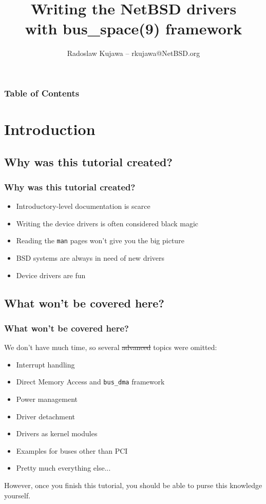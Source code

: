 \documentclass[dvipsnames,table]{beamer}
\title{Writing the NetBSD drivers\\with bus\_space(9) framework}
\author{Radoslaw Kujawa -- rkujawa@NetBSD.org}
\institute{The NetBSD Foundation}
\begin{document}
\begin{frame}
\titlepage
\end{frame}

\begin{frame}[allowframebreaks]
\frametitle{Table of Contents}
{
\hypersetup{colorlinks=true,linkcolor=black,urlcolor=NetBSD-orange}
\tableofcontents
}
\end{frame}

\section{Introduction}
\subsection{Why was this tutorial created?}

\begin{frame}
\frametitle{Why was this tutorial created?}
\begin{itemize}
	\item Introductory-level documentation is scarce
	\item Writing the device drivers is often considered black magic
	\item Reading the {\tt man} pages won't give you the big picture
	\item BSD systems are always in need of new drivers
	\item Device drivers are fun {\Large \smiley}
\end{itemize}
\end{frame}

\subsection{What won't be covered here?}

\begin{frame}
\frametitle{What won't be covered here?}
We don't have much time, so several \sout{advanced} topics were omitted:
\begin{itemize}
	\item Interrupt handling
	\item Direct Memory Access and {\tt bus\_dma} framework
	\item Power management
	\item Driver detachment
	\item Drivers as kernel modules
	\item Examples for buses other than PCI
	\item Pretty much everything else...
\end{itemize}
However, once you finish this tutorial, you should be able to purse this knowledge yourself.
\end{frame}
\end{document}
